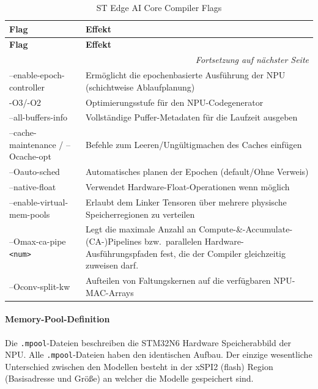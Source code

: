 \begin{longtable}{|p{}|p{}|}
    \caption{ST Edge AI Core Compiler Flags}
    \label{tab:stedgeai-flags} \\
    \hline
    \textbf{Flag} & \textbf{Effekt} \\
    \hline
    \endfirsthead
    \hline
    \textbf{Flag} & \textbf{Effekt} \\
    \hline
    \endhead
    \hline
    \multicolumn{2}{r}{\textit{Fortsetzung auf nächster Seite}} \\
    \endfoot
    \hline
    \endlastfoot
    --enable-epoch-controller & Ermöglicht die epochenbasierte Ausführung der NPU (schichtweise Ablaufplanung) \\
    \hline
    -O3/-O2 & Optimierungsstufe für den NPU-Codegenerator \\
    \hline
    --all-buffers-info & Vollständige Puffer-Metadaten für die Laufzeit ausgeben \\
    \hline
    --cache-maintenance / --Ocache-opt & Befehle zum Leeren/Ungültigmachen des Caches einfügen \\
    \hline
    --Oauto-sched & Automatisches planen der Epochen (default/Ohne Verweis) \\
    \hline
    --native-float & Verwendet Hardware-Float-Operationen wenn möglich \\
    \hline
    --enable-virtual-mem-pools & Erlaubt dem Linker Tensoren über mehrere physische Speicherregionen zu verteilen \\
    \hline
    --Omax-ca-pipe \texttt{<num>} & Legt die maximale Anzahl an Compute-\&-Accumulate-(CA-)Pipelines bzw.\ parallelen Hardware-Ausführungspfaden fest, die der Compiler gleichzeitig zuweisen darf. \\
    \hline
    --Oconv-split-kw & Aufteilen von Faltungskernen auf die verfügbaren NPU-MAC-Arrays \\
    \hline
\end{longtable}

\paragraph{Memory-Pool-Definition}
Die \texttt{.mpool}-Dateien beschreiben die STM32N6 Hardware Speicherabbild der NPU. Alle \texttt{.mpool}-Dateien haben den identischen Aufbau. Der einzige wesentliche Unterschied zwischen den Modellen besteht in der xSPI2 (flash) Region (Basisadresse und Größe) an welcher die Modelle gespeichert sind.

